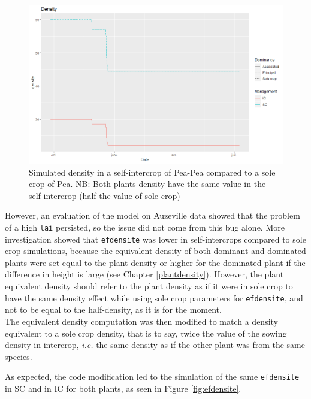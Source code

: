 \documentclass[]{book}
\begin{document}
\begin{figure}
\centering
\includegraphics{img/densitefrost.png}
\caption{\label{fig:densitefrost}Simulated density in a self-intercrop of Pea-Pea compared to a sole crop of Pea. NB: Both plants density have the same value in the self-intercrop (half the value of sole crop)}
\end{figure}

However, an evaluation of the model on Auzeville data showed that the problem of a high \texttt{lai} persisted, so the issue did not come from this bug alone.
More investigation showed that \texttt{efdensite} was lower in self-intercrops compared to sole crop simulations, because the equivalent density of both dominant and dominated plants were set equal to the plant density or higher for the dominated plant if the difference in height is large (see Chapter \ref{plantdensity}). However, the plant equivalent density should refer to the plant density as if it were in sole crop to have the same density effect while using sole crop parameters for \texttt{efdensite}, and not to be equal to the half-density, as it is for the moment.\\
The equivalent density computation was then modified to match a density equivalent to a sole crop density, that is to say, twice the value of the sowing density in intercrop, \emph{i.e.} the same density as if the other plant was from the same species.

As expected, the code modification led to the simulation of the same \texttt{efdensite} in SC and in IC for both plants, as seen in Figure \ref{fig:efdensite}.
\end{document}
